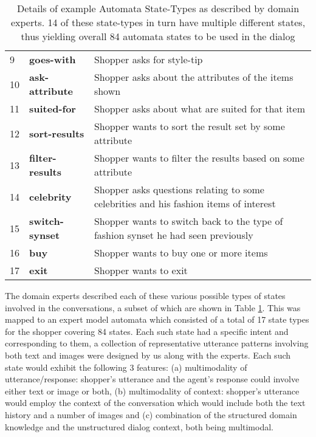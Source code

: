 \documentclass[letterpaper]{article} %
\begin{document}
\begin{table}[t]
{{\begin{center}
\begin{tabular}{|p{0.3cm}|p{1.3cm}|p{5.5cm}|}
9 & \textbf{goes-with} & Shopper asks for style-tip\\  \Xhline{2\arrayrulewidth} 
10 & \textbf{ask-attribute} & Shopper asks about the attributes of the items shown\\  \Xhline{2\arrayrulewidth} 
11 & \textbf{suited-for} & Shopper asks about what are suited for that item\\  \Xhline{2\arrayrulewidth} 
12 & \textbf{sort-results} & Shopper wants to sort the result set by some attribute\\  \Xhline{2\arrayrulewidth} 
13 & \textbf{filter-results} & Shopper wants to filter the results based on some attribute\\  \Xhline{2\arrayrulewidth} 
14 & \textbf{celebrity} & Shopper asks questions relating to some celebrities and his fashion items of interest\\  \Xhline{2\arrayrulewidth} 
15 & \textbf{switch-synset} & Shopper wants to switch back to the type of fashion synset he had seen previously\\  \Xhline{2\arrayrulewidth} 
16 & \textbf{buy} & Shopper wants to buy one or more items\\  \Xhline{2\arrayrulewidth} 
17 & \textbf{exit} & Shopper wants to exit \\ \hline
\end{tabular}
\end{center}
}
}
\caption{Details of example Automata State-Types as described by domain experts. 14 of these state-types in turn have multiple different states, thus yielding overall 84 automata states to be used in the dialog}
\label{tab:automatastates}
\end{table}

The domain experts described each of these various possible types of states involved in the conversations, a subset of which are shown in Table \ref{tab:automatastates}. This was mapped to an expert model automata which consisted of a total of 17 state types for the shopper covering 84 states. Each such state had a specific intent and corresponding to them, a collection of representative utterance patterns involving both text and images were designed by us along with the experts. Each such state would exhibit the following 3 features: (a) multimodality of utterance/response: shopper's utterance and the agent's response could involve either text or image or both, (b) multimodality of context: shopper's utterance would employ the context of the conversation which would include both the text history and a number of images and (c) combination of the structured domain knowledge and the unstructured dialog context, both being multimodal.
\end{document}

